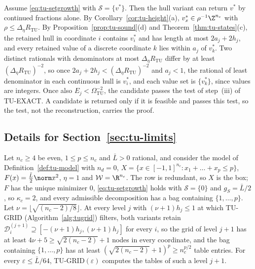 \begin{remark}\label{rem:tu-cf}
Assume \eqref{eq:tu-setgrowth} with $\mathcal S=\{v^*\}$. Then the hull
variant can return $v^*$ by continued fractions alone. By
Corollary~\ref{cor:tu-height}(a), $v^*_x\in\rho^{-1}\Z^{n_c}$ with
$\rho\le\Delta_\eta R_{\mathrm{TU}}$. By Proposition~\ref{prop:tu-sound}(d)
and Theorem~\ref{thm:tu-states}(c), the retained hull in coordinate $i$
contains $v^*_i$ and has length at most $2a_j+2h_j$, and every retained value
of a discrete coordinate $k$ lies within $a_j$ of $v^*_k$. Two distinct rationals with denominators at most
$\Delta_\eta R_{\mathrm{TU}}$ differ by at least $(\Delta_\eta R_{\mathrm{TU}})^{-2}$,
so once $2a_j+2h_j<(\Delta_\eta R_{\mathrm{TU}})^{-2}$ and $a_j<1$, the rational
of least denominator in each continuous hull is $v^*_i$, and each value set
is $\{v^*_k\}$, since values are integers. Once also
$E_j<\Omega_{\mathrm{TU}}^{-2}$, the candidate passes the test of
step~(iii) of TU-EXACT. A candidate is returned only if it is feasible and
passes this test, so the test, not the reconstruction, carries the proof.
\end{remark}

\subsection{Details for Section~\ref{sec:tu-limits}}\label{app:tu-limits}

\begin{lemma}\label{lem:tu-uniform}
Let $n_c\ge4$ be even, $1\le p\le n_c$ and $\bar L>0$ rational, and consider
the model of Definition~\ref{def:tu-model} with $n_d=0$,
$X=\{x\in[-1,1]^{n_c}:x_1+\dots+x_p\le p\}$, $F(x)=\frac{\bar L}2\norm x^2$,
$\eta=1$ and $\mathcal W=\R^{n_c}$. The row is redundant, so $X$ is the box;
$F$ has the unique minimizer $0$, \eqref{eq:tu-setgrowth} holds with
$\mathcal S=\{0\}$ and $g_S=\bar L/2$, so $\kappa_c=2$, and every admissible
decomposition has a bag containing $\{1,\dots,p\}$. Let
$\nu=\lfloor\sqrt{(n_c-2)/8}\rfloor$. At every level $j$ with
$(\nu+1)h_j\le1$ at which TU-GRID (Algorithm~\ref{alg:tugrid}) filters, both
variants retain $\mathcal D^{(j+1)}_i\supseteq[-(\nu+1)h_j,(\nu+1)h_j]$ for
every $i$, so the grid of level $j+1$ has at least $4\nu+5\ge\sqrt{2(n_c-2)}+1$ nodes in
every coordinate, and the bag containing $\{1,\dots,p\}$ has at least
$(\sqrt{2(n_c-2)}+1)^p\ge n_c^{p/2}$ table entries. For every
$\varepsilon\le\bar L/64$, TU-GRID$(\varepsilon)$ computes the tables of such
a level $j+1$.
\end{lemma}

